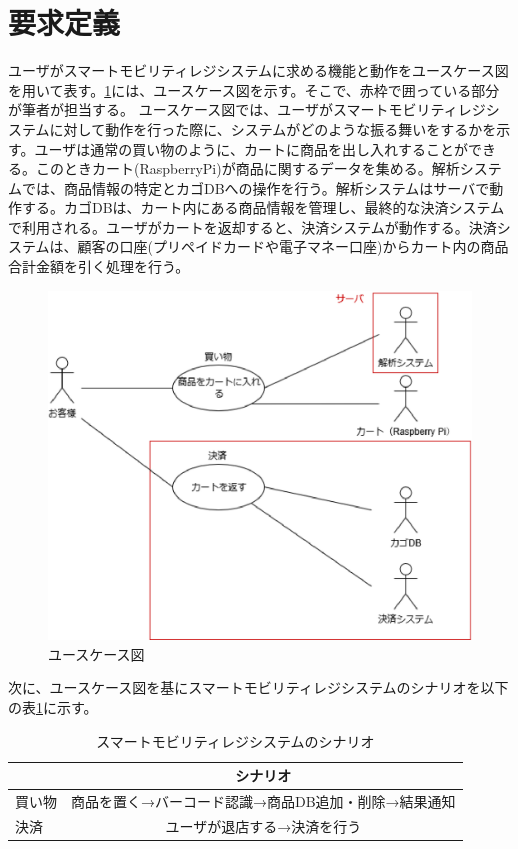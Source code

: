 \section{要求定義}
ユーザがスマートモビリティレジシステムに求める機能と動作をユースケース図を用いて表す。\ref{usecase}には、ユースケース図を示す。そこで、赤枠で囲っている部分が筆者が担当する。
ユースケース図では、ユーザがスマートモビリティレジシステムに対して動作を行った際に、システムがどのような振る舞いをするかを示す。ユーザは通常の買い物のように、カートに商品を出し入れすることができる。このときカート(RaspberryPi)が商品に関するデータを集める。解析システムでは、商品情報の特定とカゴDBへの操作を行う。解析システムはサーバで動作する。カゴDBは、カート内にある商品情報を管理し、最終的な決済システムで利用される。ユーザがカートを返却すると、決済システムが動作する。決済システムは、顧客の口座(プリペイドカードや電子マネー口座)からカート内の商品合計金額を引く処理を行う。

\begin{figure}[htbp]
\centering
\includegraphics[width=12cm]{./pic/usecase_saishu.eps}
\caption{ユースケース図}
\label{usecase}
\end{figure}

次に、ユースケース図を基にスマートモビリティレジシステムのシナリオを以下の表\ref{scenario}に示す。
\begin{table}[htb]
\begin{center}
\caption{スマートモビリティレジシステムのシナリオ}
\begin{tabular}{|l|c|} \hline
 & シナリオ \\ \hline \hline
買い物 & 商品を置く→バーコード認識→商品DB追加・削除→結果通知 \\
決済 & ユーザが退店する→決済を行う \\ \hline
\end{tabular}
\label{scenario}
\end{center}
\end{table}

